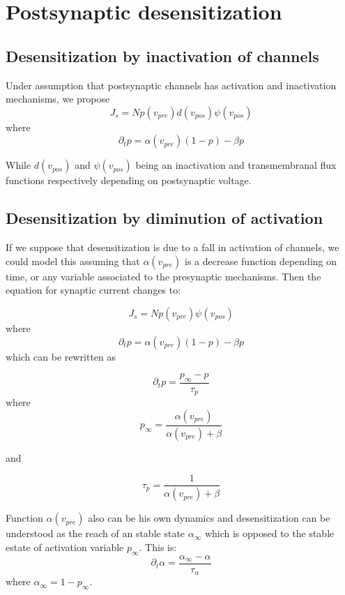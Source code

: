 \newpage

\section{Postsynaptic desensitization}

\subsection{Desensitization by inactivation of channels}
Under  assumption that postsynaptic channels has  activation and inactivation mechanisms, we propose    
\begin{equation}
    J_s = N p(v_{pre})d(v_{pos})\psi(v_{pos}) 
\end{equation}
where 
\begin{equation}
\partial_tp = \alpha(v_{pre})(1-p)-\beta p    
\end{equation}

While $d(v_{pos})$ and $\psi(v_{pos})$ being an inactivation  and transmembranal flux functions respectively depending on postsynaptic voltage.

\subsection{Desensitization by diminution of activation}

If we suppose that desensitization is due to a fall in activation of channels, we could model this assuming that $\alpha(v_{pre})$ is a decrease function depending on time, or any variable associated to the presynaptic mechanisms. Then the equation for synaptic current changes to: 

\begin{equation}
    J_s = N p(v_{pre})\psi(v_{pos}) 
\end{equation}
where 
\begin{equation}
\partial_tp = \alpha(v_{pre})(1-p)-\beta p    
\end{equation}
which can be rewritten as

\begin{equation}
    \partial_tp = \frac{p_{\infty}-p}{\tau_p}
\end{equation}
where 
\begin{equation}
    p_{\infty} = \frac{\alpha(v_{pre})}{\alpha(v_{pre})+\beta} 
\end{equation}

and 

\begin{equation}
    \tau_p = \frac{1}{\alpha(v_{pre}) + \beta}
\end{equation}

Function $\alpha(v_{pre})$ also can be his own dynamics and desensitization can be understood as the reach of an stable state $\alpha_{\infty}$ which is opposed to the stable estate of activation variable $p_{\infty}$. This is:
\begin{equation}
    \partial_t \alpha = \frac{\alpha_{\infty} - \alpha}{\tau_{\alpha}}
\end{equation}
where $\alpha_{\infty} = 1 - p_{\infty} $.
